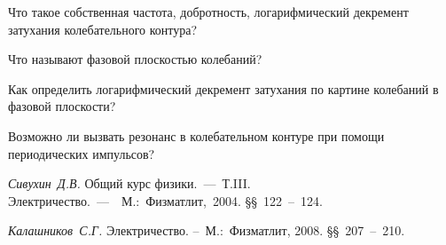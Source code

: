 \begin{lab:questions}
	\item Что такое собственная частота, добротность, логарифмический декремент затухания колебательного контура?
	\item Что называют фазовой плоскостью колебаний?
	\item  Как определить логарифмический декремент затухания по картине колебаний в фазовой плоскости?
	\item  Возможно ли вызвать резонанс в колебательном контуре при помощи периодических импульсов?
\end{lab:questions}

\begin{lab:literature}

	\item \emph{Сивухин~Д.В.} Общий курс физики.~---~Т.III. Электричество.~---~~М.:~Физматлит,~2004. \S\S~122~--~124.

	\item \emph{Калашников~С.Г.} Электричество. --~М.:~Физматлит, 2008. \S\S~207~--~210.
\end{lab:literature}